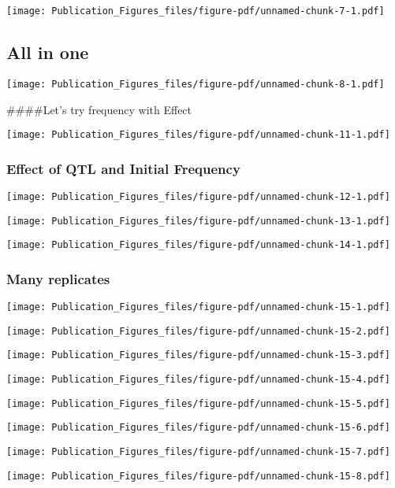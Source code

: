 \documentclass[
  letterpaper,
  DIV=11,
  numbers=noendperiod]{scrartcl}
\begin{document}
\texttt{[image: Publication\_Figures\_files/figure-pdf/unnamed-chunk-7-1.pdf]}

\hypertarget{all-in-one}{%
\subsection{All in one}\label{all-in-one}}

\texttt{[image: Publication\_Figures\_files/figure-pdf/unnamed-chunk-8-1.pdf]}

\#\#\#\#Let's try frequency with Effect

\texttt{[image: Publication\_Figures\_files/figure-pdf/unnamed-chunk-11-1.pdf]}

\hypertarget{effect-of-qtl-and-initial-frequency}{%
\subsubsection{Effect of QTL and Initial
Frequency}\label{effect-of-qtl-and-initial-frequency}}

\texttt{[image: Publication\_Figures\_files/figure-pdf/unnamed-chunk-12-1.pdf]}

\texttt{[image: Publication\_Figures\_files/figure-pdf/unnamed-chunk-13-1.pdf]}

\texttt{[image: Publication\_Figures\_files/figure-pdf/unnamed-chunk-14-1.pdf]}

\hypertarget{many-replicates}{%
\subsubsection{Many replicates}\label{many-replicates}}

\texttt{[image: Publication\_Figures\_files/figure-pdf/unnamed-chunk-15-1.pdf]}

\texttt{[image: Publication\_Figures\_files/figure-pdf/unnamed-chunk-15-2.pdf]}

\texttt{[image: Publication\_Figures\_files/figure-pdf/unnamed-chunk-15-3.pdf]}

\texttt{[image: Publication\_Figures\_files/figure-pdf/unnamed-chunk-15-4.pdf]}

\texttt{[image: Publication\_Figures\_files/figure-pdf/unnamed-chunk-15-5.pdf]}

\texttt{[image: Publication\_Figures\_files/figure-pdf/unnamed-chunk-15-6.pdf]}

\texttt{[image: Publication\_Figures\_files/figure-pdf/unnamed-chunk-15-7.pdf]}

\texttt{[image: Publication\_Figures\_files/figure-pdf/unnamed-chunk-15-8.pdf]}
\end{document}
